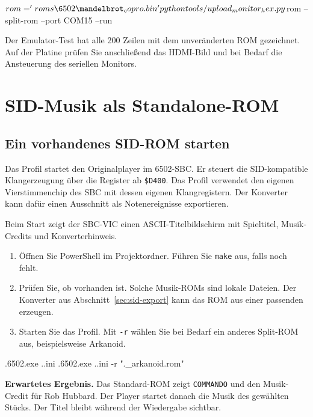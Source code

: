 \documentclass[fontsize=10.2bp,DIV=calc,oneside,open=any,headings=normal,numbers=noenddot]{scrbook}
\begin{document}
\begin{commandblock}
$rom = 'roms\6502\mandelbrot_copro.bin'
python tools/upload_monitor_hex.py $rom --split-rom --port COM15 --run
\end{commandblock}

Der Emulator-Test hat alle 200 Zeilen mit dem unveränderten ROM gezeichnet.
Auf der Platine prüfen Sie anschließend das HDMI-Bild und bei Bedarf die
Ansteuerung des seriellen Monitors.

\chapter{SID-Musik als Standalone-ROM}\label{ch:sid}

\section{Ein vorhandenes SID-ROM starten}\label{sec:sid-start}
Das Profil  startet den Originalplayer im 6502-SBC. Er steuert
die SID-kompatible Klangerzeugung über die Register ab \texttt{\$D400}.
Das Profil  verwendet den eigenen Vierstimmenchip des
SBC mit dessen eigenen Klangregistern. Der Konverter kann dafür einen
Ausschnitt als Notenereignisse exportieren.

Beim Start zeigt der SBC-VIC einen ASCII-Titelbildschirm mit Spieltitel,
Musik-Credits und Konverterhinweis.

\begin{enumerate}
  \item Öffnen Sie PowerShell im Projektordner. Führen Sie \texttt{make}
    aus, falls  noch fehlt.
  \item Prüfen Sie, ob  vorhanden
    ist. Solche Musik-ROMs sind lokale Dateien. Der Konverter aus
    Abschnitt~\ref{sec:sid-export} kann das ROM aus einer passenden
     erzeugen.
  \item Starten Sie das Profil. Mit \texttt{-r} wählen Sie bei Bedarf ein
    anderes Split-ROM aus, beispielsweise Arkanoid.
\end{enumerate}

\begin{commandblock}
.\bin\sbc6502.exe .\sid.ini
.\bin\sbc6502.exe .\sid.ini -r ".\roms\sid\fpga\sound_arkanoid.rom"
\end{commandblock}

\textbf{Erwartetes Ergebnis.} Das Standard-ROM zeigt \texttt{COMMANDO} und
den Musik-Credit für Rob Hubbard. Der Player startet danach die Musik
des gewählten Stücks. Der Titel bleibt während der Wiedergabe sichtbar.
\end{document}
